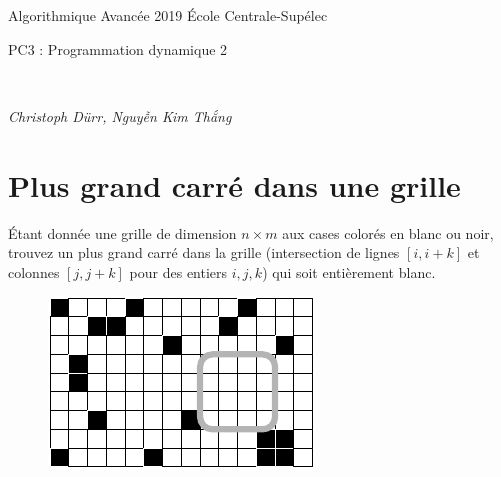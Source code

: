 \documentclass[12pt]{article}
\newcommand{\MakeScribeTop}[1]{
\noindent
\begin{framed}
\noindent
 Algorithmique Avancée 2019
 \hfill
 École Centrale-Supélec
 \\[1em]
 \centerline{ \Large
#1
 }
 \\[1em]
\centerline{  \it Christoph Dürr, Nguyễn Kim Thắng}
\end{framed}
}
\begin{document}
    \MakeScribeTop{PC3 : Programmation dynamique 2}




\section{Plus grand carré dans une grille}

Étant donnée une grille de dimension $n\times m$ aux cases colorés en blanc ou noir, trouvez un plus grand carré dans la grille (intersection de lignes $[i,i+k]$ et colonnes $[j,j+k]$ pour des entiers $i,j,k$) qui soit entièrement blanc.

\begin{figure}[h]
\centerline{\includegraphics{plus_grand_carre}}
\end{figure}
\end{document}
